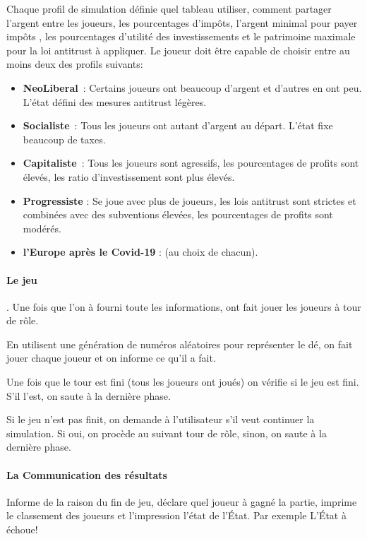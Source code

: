\documentclass[12pt]{article}
\begin{document}
  Chaque profil de simulation définie quel tableau utiliser, comment partager l'argent entre les joueurs, les pourcentages d'impôts, l'argent minimal pour payer impôts , les pourcentages d'utilité des investissements et le patrimoine maximale pour la loi antitrust à appliquer. 
  Le joueur doit être capable de choisir entre au moins deux des profils suivants: 
  \begin{itemize}
  	\item \textbf{NeoLiberal}~: Certains joueurs ont beaucoup d'argent et d'autres en ont peu. L'état défini des mesures antitrust légères.
  	\item \textbf{Socialiste}~: Tous les joueurs ont autant d'argent au départ. L'état fixe beaucoup de taxes.
  	\item \textbf{Capitaliste}~: Tous les joueurs sont agressifs, les pourcentages de profits sont élevés,  les ratio d'investissement sont plus élevés.
  	\item \textbf{Progressiste} : Se joue avec plus de joueurs, les lois antitrust sont strictes et combinées avec des subventions élevées, les pourcentages de profits sont modérés.
  	\item \textbf{l'Europe après le Covid-19} : (au choix de chacun).
\end{itemize}
 
 
  \paragraph{Le jeu}. 
  	Une fois que l'on à fourni toute les informations, ont fait jouer les joueurs à tour de rôle.
	
	 En utilisent une génération de numéros aléatoires pour représenter le dé, on fait jouer chaque joueur et on informe ce qu'il a fait.
	 
	 Une fois que le tour est fini (tous les joueurs ont joués) on vérifie si le jeu est fini. S'il l'est, on saute à la dernière phase. 
	 
	 Si le jeu n'est pas finit, on demande à l'utilisateur s'il veut continuer la simulation. Si oui, on procède au suivant tour de rôle, sinon, on saute à la dernière phase.
	
  
  \paragraph{La Communication des résultats} Informe de la raison du fin de jeu, déclare quel joueur à gagné la partie, imprime le classement des joueurs et l'impression l'état de l'État. 
  	Par exemple
\begingroup\makeatletter\def\@currenvir{verbatim}
\verbatim
	  L'État à échoue! 
	
\end{document}
